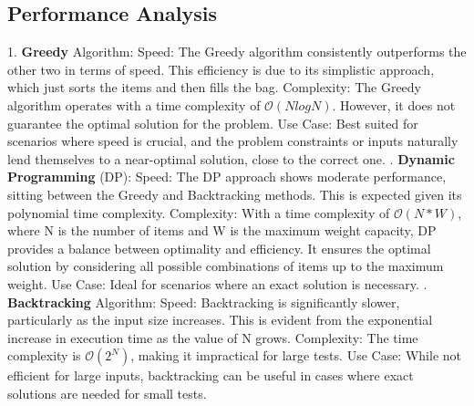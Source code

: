 \documentclass[runningheads]{llncs}
\begin{document}
\subsection{Performance Analysis}
1. \textbf{Greedy} Algorithm:
Speed: The Greedy algorithm consistently outperforms the other two in terms of speed. This
efficiency is due to its simplistic approach, which just sorts the items and then fills the bag.
Complexity: The Greedy algorithm operates with a time complexity of $\mathcal{O}(NlogN)$. However, it does not guarantee the optimal solution for the problem.
Use Case: Best suited for scenarios where speed is crucial, and the problem constraints or inputs 
naturally lend themselves to a near-optimal solution, close to the correct one.
. \textbf{Dynamic Programming} (DP):
Speed: The DP approach shows moderate performance, sitting between the Greedy and Backtracking 
methods. This is expected given its polynomial time complexity.
Complexity: With a time complexity of $\mathcal{O}(N*W)$,  where N is the number of items and 
W is the maximum weight capacity, DP provides a balance between optimality and efficiency. It 
ensures the optimal solution by considering all possible combinations of items up to the maximum
weight.
Use Case: Ideal for scenarios where an exact solution is necessary.
. \textbf{Backtracking} Algorithm:
Speed: Backtracking is significantly slower, particularly as the input size increases. This is
evident from the exponential increase in execution time as the value of N grows.
Complexity: The time complexity is $\mathcal{O}(2^N)$, making it impractical for large tests.
Use Case: While not efficient for large inputs, backtracking can be useful in cases where exact 
solutions are needed for small tests.
\end{document}
